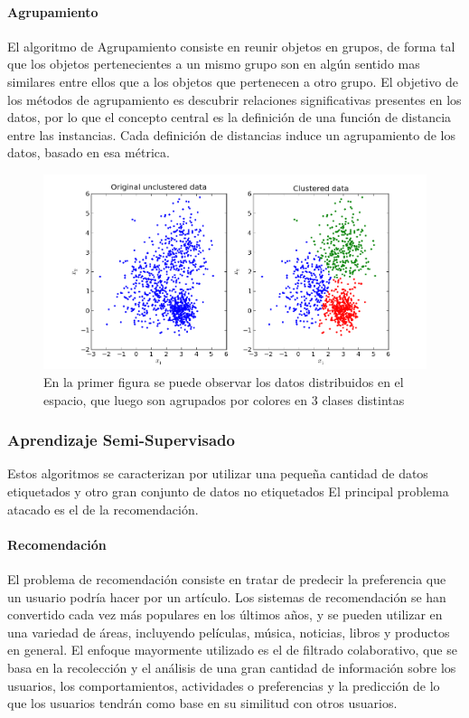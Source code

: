 \documentclass[a4paper,11pt,spanish]{book}
\begin{document}
	\paragraph {Agrupamiento}
	   El algoritmo de Agrupamiento consiste en reunir objetos en grupos, de forma tal que los objetos pertenecientes a un mismo grupo son en algún sentido mas similares
	   entre ellos que a los objetos que pertenecen a otro grupo. El objetivo de los métodos de agrupamiento es descubrir relaciones significativas presentes en los datos, por lo
	   que el concepto central es la definición de una función de distancia entre las instancias. Cada definición de distancias induce un agrupamiento de los datos, basado en esa métrica.

	  \begin{figure}[h]
	    \includegraphics[scale=0.5]{./img/stackoverflow_clustering.png}
	    \caption{En la primer figura se puede observar los datos distribuidos en el espacio, que luego son agrupados por colores en 3 clases distintas}
	    \label{fig:clustering}
	  \end{figure}

      \subsubsection{Aprendizaje Semi-Supervisado}
	Estos algoritmos se caracterizan por utilizar una pequeña cantidad de datos etiquetados y otro gran conjunto de datos no etiquetados
	El principal problema atacado es el de la recomendación.
	\paragraph{Recomendación}
	  El problema de recomendación consiste en tratar de predecir la preferencia que un usuario podría hacer por un artículo. Los sistemas de recomendación se han convertido cada
	  vez más populares en los últimos años, y se pueden utilizar en una variedad de áreas, incluyendo películas, música, noticias, libros y productos en general.
	  El enfoque mayormente utilizado es el de filtrado colaborativo, que se basa en la recolección y el análisis de una gran cantidad de información sobre los usuarios,
	  los comportamientos, actividades o preferencias y la predicción de lo que los usuarios tendrán como base en su similitud con otros usuarios.
\end{document}
